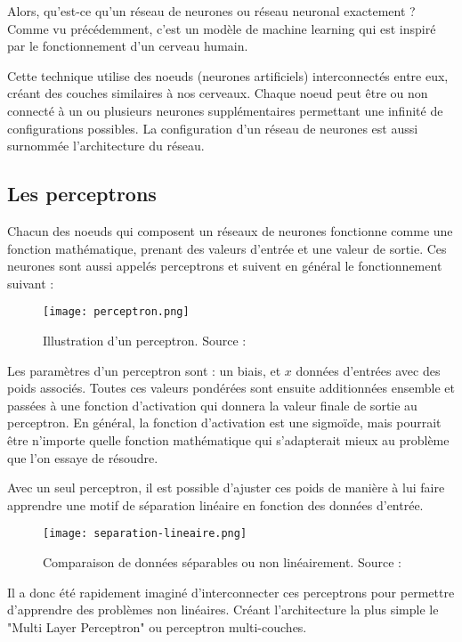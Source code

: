 Alors, qu'est-ce qu'un réseau de neurones ou réseau neuronal exactement ?
Comme vu précédemment, c'est un modèle de machine learning qui est inspiré par le fonctionnement d'un cerveau humain.

Cette technique utilise des noeuds (neurones artificiels) interconnectés entre eux, créant des couches similaires à nos cerveaux.
Chaque noeud peut être ou non connecté à un ou plusieurs neurones supplémentaires permettant une infinité de configurations possibles.
La configuration d'un réseau de neurones est aussi surnommée l'architecture du réseau.

\subsection{Les perceptrons}

Chacun des noeuds qui composent un réseaux de neurones fonctionne comme une fonction mathématique, prenant des valeurs d'entrée et une valeur de sortie.
Ces neurones sont aussi appelés perceptrons et suivent en général le fonctionnement suivant :

\begin{figure}[tbph!]
	\centering
	\texttt{[image: perceptron.png]}
	\caption[Illustration d'un perceptron]{Illustration d'un perceptron. Source : \cite{PerceptronImage}}
\end{figure}

Les paramètres d'un perceptron sont : un biais, et $x$ données d'entrées avec des poids associés. Toutes ces valeurs pondérées sont ensuite additionnées ensemble
et passées à une fonction d'activation qui donnera la valeur finale de sortie au perceptron. En général, la fonction d'activation est une sigmoïde, 
mais pourrait être n'importe quelle fonction mathématique qui s'adapterait mieux au problème que l'on essaye de résoudre.

Avec un seul perceptron, il est possible d'ajuster ces poids de manière à lui faire apprendre une motif de
séparation linéaire en fonction des données d'entrée. 

\begin{figure}[tbph!]
	\centering
	\texttt{[image: separation-lineaire.png]}
	\caption[Comparaison de données séparables ou non linéairement]{Comparaison de données séparables ou non linéairement. Source : \cite{LinearSeparation}}
\end{figure}

Il a donc été rapidement imaginé d'interconnecter ces perceptrons pour permettre d'apprendre des problèmes non linéaires. 
Créant l'architecture la plus simple le "Multi Layer Perceptron" ou perceptron multi-couches.

